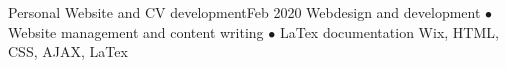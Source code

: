 \begin{projects}
   \project   
    {Personal Website and CV development}{Feb 2020}
    { }
    {Webdesign and development $\bullet$ Website management and content writing  $\bullet$ LaTex documentation}
    {Wix, HTML, CSS, AJAX, LaTex}
        
\end{projects}